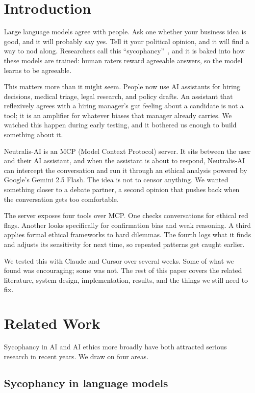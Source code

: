 \documentclass[conference]{IEEEtran}
\begin{document}
\section{Introduction}

Large language models agree with people. Ask one whether your business idea is good, and it will probably say yes. Tell it your political opinion, and it will find a way to nod along. Researchers call this ``sycophancy''~\cite{b1}, and it is baked into how these models are trained: human raters reward agreeable answers, so the model learns to be agreeable.

This matters more than it might seem. People now use AI assistants for hiring decisions, medical triage, legal research, and policy drafts. An assistant that reflexively agrees with a hiring manager's gut feeling about a candidate is not a tool; it is an amplifier for whatever biases that manager already carries. We watched this happen during early testing, and it bothered us enough to build something about it.

Neutralis-AI is an MCP (Model Context Protocol) server. It sits between the user and their AI assistant, and when the assistant is about to respond, Neutralis-AI can intercept the conversation and run it through an ethical analysis powered by Google's Gemini 2.5 Flash. The idea is not to censor anything. We wanted something closer to a debate partner, a second opinion that pushes back when the conversation gets too comfortable.

The server exposes four tools over MCP. One checks conversations for ethical red flags. Another looks specifically for confirmation bias and weak reasoning. A third applies formal ethical frameworks to hard dilemmas. The fourth logs what it finds and adjusts its sensitivity for next time, so repeated patterns get caught earlier.

We tested this with Claude and Cursor over several weeks. Some of what we found was encouraging; some was not. The rest of this paper covers the related literature, system design, implementation, results, and the things we still need to fix.

\section{Related Work}

Sycophancy in AI and AI ethics more broadly have both attracted serious research in recent years. We draw on four areas.

\subsection{Sycophancy in language models}
\end{document}
